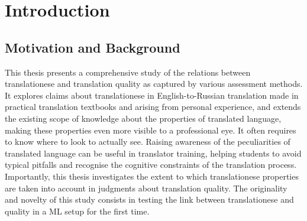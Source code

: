 \chapter{\label{cha:intro}Introduction}
%

\section{\label{sec:motivation}Motivation and Background}

This thesis presents a comprehensive study of the relations between translationese and translation quality as captured by various assessment methods. 
It explores claims about translationese in English-to-Russian translation made in practical translation textbooks and arising from personal experience, and extends the existing scope of knowledge about the properties of translated language, making these properties even more visible to a professional eye. It often requires to know where to look to actually see. Raising awareness of the peculiarities of translated language can be useful in translator training, helping students to avoid typical pitfalls and recognise the cognitive constraints of the translation process. Importantly, this thesis investigates the extent to which translationese properties are taken into account in judgments about translation quality.
The originality and novelty of this study consists in testing the link between translationese and quality in a \gls{ML} setup for the first time. 

